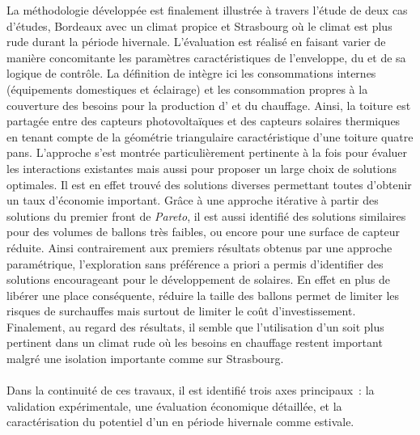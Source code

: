 La méthodologie développée est finalement illustrée à travers l’étude de deux cas
d’études, Bordeaux avec un climat propice et Strasbourg où le climat est plus rude durant
la période hivernale. L’évaluation est réalisé en faisant varier de manière concomitante
les paramètres caractéristiques de l’enveloppe, du  et de sa logique de contrôle.
La définition de  intègre ici les consommations internes (équipements
domestiques et éclairage) et les consommation propres à la couverture des besoins pour la
production d’ et du chauffage. Ainsi, la toiture est partagée entre des capteurs
photovoltaïques et des capteurs solaires thermiques en tenant compte de la géométrie
triangulaire caractéristique d’une toiture quatre pans. L’approche s’est montrée
particulièrement pertinente à la fois pour évaluer les interactions existantes mais aussi
pour proposer un large choix de solutions optimales. Il est en effet trouvé des solutions
diverses permettant toutes d’obtenir un taux d’économie important. Grâce à une approche
itérative à partir des solutions du premier front de \textit{Pareto}, il est aussi identifié des
solutions similaires pour des volumes de ballons très faibles, ou encore pour une surface de
capteur réduite. Ainsi contrairement aux premiers résultats obtenus par une approche
paramétrique, l’exploration sans préférence a priori a permis d’identifier des solutions
encourageant pour le développement de  solaires. En effet en plus de libérer une place conséquente, réduire la taille des
ballons permet de limiter les risques de surchauffes mais surtout de limiter le coût d’investissement.
Finalement, au regard des résultats, il semble que l’utilisation d’un  soit plus pertinent
dans un climat rude où les besoins en chauffage restent important malgré une isolation
importante comme sur Strasbourg.


\paragraph{} %
Dans la continuité de ces travaux, il est identifié trois axes principaux~: la validation
expérimentale, une évaluation économique détaillée, et la caractérisation du potentiel
d’un  en période hivernale comme estivale.


